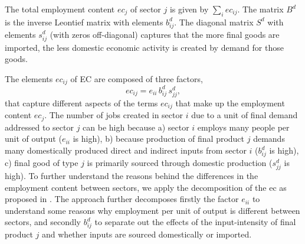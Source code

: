 \documentclass[12pt,english]{article}
\begin{document}
The total employment content $ec_j$ of sector $j$ is given by $\sum_i ec_{ij}$. The matrix $B^d$ is the inverse Leontief matrix with elements $b^d_{ij}$. The diagonal matrix $S^d$ with elements $s^d_{ij}$ (with zeros off-diagonal) captures that the more final goods are imported, the less domestic economic activity is created by demand for those goods.

The elements $ec_{ij}$ of EC are composed of three factors, 
\begin{equation}ec_{ij} = e_{ii} \, b^d_{ij} \, s^d_{jj}, \label{EC_decomp}\end{equation}
that capture different aspects of the terms $ec_{ij}$ that make up the employment content $ec_j$. The number of jobs created in sector $i$ due to a unit of final demand addressed to sector $j$ can be high because a) sector $i$ employs many people per unit of output ($e_{ii}$ is high), b) because production of final product $j$ demands many domestically produced direct and indirect inputs from sector $i$ ($b^d_{ij}$ is high), c) final good of type $j$ is primarily sourced through domestic production ($s^d_{jj}$ is high). To further understand the reasons behind the differences in the employment content between sectors, we apply the decomposition of the ec as proposed in \citep{perrier2017transition}. The approach further decomposes firstly the factor $e_{ii}$ to understand some reasons why employment per unit of output is different between sectors, and secondly $b^d_{ij}$ to separate out the effects of the input-intensity of final product $j$ and whether inputs are sourced domestically or imported.
\end{document}
